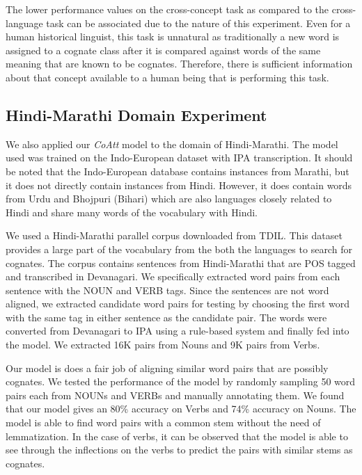 \documentclass[11pt,letterpaper]{article}
\begin{document}
The lower performance values on the cross-concept task as compared to the cross-language task can be associated due to the nature of this experiment.  Even for a human historical linguist, this task is unnatural as traditionally a new word is assigned to a cognate class after it is compared against words of the same meaning that are known to be cognates. Therefore, there is sufficient information about that concept available to a human being that is performing this task. 

\subsection{Hindi-Marathi Domain Experiment}

We also applied our \textit{CoAtt} model to the domain of Hindi-Marathi. The model used was trained on the Indo-European dataset with IPA transcription. It should be noted that the Indo-European database contains instances from Marathi, but it does not directly contain instances from Hindi. However, it does contain words from Urdu and Bhojpuri (Bihari) which are also languages closely related to Hindi and share many words of the vocabulary with Hindi.

We used a Hindi-Marathi parallel corpus downloaded from TDIL. This dataset provides a large part of the vocabulary from the both the languages to search for cognates. The corpus contains sentences from Hindi-Marathi that are POS tagged and transcribed in Devanagari. We specifically extracted word pairs from each sentence with the NOUN and VERB tags. Since the sentences are not word aligned, we extracted candidate word pairs for testing by choosing the first word with the same tag in either sentence as the candidate pair. The words were converted from Devanagari to IPA using a rule-based system and finally fed into the model. We extracted 16K pairs from Nouns and 9K pairs from Verbs.

Our model is does a fair job of aligning similar word pairs that are possibly cognates. We tested the performance of the model by randomly sampling 50 word pairs each from NOUNs and VERBs and manually annotating them. We found that our model gives an 80\% accuracy on Verbs and 74\% accuracy on Nouns. The model is able to find word pairs with a common stem without the need of lemmatization. In the case of verbs, it can be observed that the model is able to see through the inflections on the verbs to predict the pairs with similar stems as cognates. 
\end{document}
